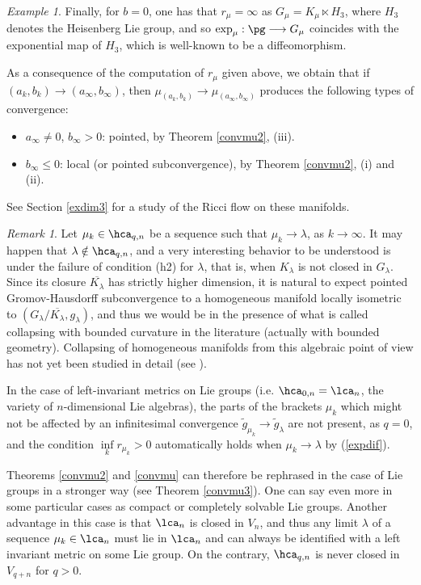 \documentclass[11pt]{amsart}
\theoremstyle{plain}
\theoremstyle{definition}
\theoremstyle{remark}
\newtheorem{remark}[theorem]{Remark}
\newtheorem{example}[theorem]{Example}
\begin{document}
\begin{example}
Finally, for $b=0$, one has that $r_\mu=\infty$ as $G_\mu=K_\mu\ltimes H_3$, where $H_3$ denotes the Heisenberg Lie group, and so $\exp_\mu:\pg\longrightarrow G_\mu$ coincides with the exponential map of $H_3$, which is well-known to be a diffeomorphism.

As a consequence of the computation of $r_\mu$ given above, we obtain that if $(a_k,b_k)\to (a_\infty,b_\infty)$, then $\mu_{(a_k,b_k)}\to \mu_{(a_\infty,b_\infty)}$ produces the following types of convergence:

\begin{itemize}
\item $a_\infty\ne 0$, $b_\infty>0$: pointed, by Theorem \ref{convmu2}, (iii).

\item $b_\infty\leq 0$: local (or pointed subconvergence), by Theorem \ref{convmu2}, (i) and (ii).
\end{itemize}
See Section \ref{exdim3} for a study of the Ricci flow on these manifolds.
\end{example}


\begin{remark}
Let $\mu_k\in\hca_{q,n}$ be a sequence such that $\mu_k\to\lambda$, as $k\to\infty$.  It may happen that $\lambda\notin\hca_{q,n}$, and a very interesting behavior to be understood is under the failure of condition (h2) for $\lambda$, that is, when $K_\lambda$ is not closed in $G_\lambda$.  Since its closure $\overline{K_\lambda}$ has strictly higher dimension, it is natural to expect pointed Gromov-Hausdorff subconvergence to a homogeneous manifold locally isometric to $(G_\lambda/\overline{K_\lambda},g_\lambda)$, and thus we would be in the presence of what is called collapsing with bounded curvature in the literature (actually with bounded geometry).  Collapsing of homogeneous manifolds from this algebraic point of view has not yet been studied in detail (see \cite[Section 6.5]{spacehm}).
\end{remark}


In the case of left-invariant metrics on Lie groups (i.e. $\hca_{0,n}=\lca_n$, the variety of $n$-dimensional Lie algebras), the parts of the brackets $\mu_k$ which might not be affected by an infinitesimal convergence $\tilde{g}_{\mu_k}\to\tilde{g}_\lambda$ are not present, as $q=0$, and the condition $\inf\limits_k r_{\mu_k}>0$ automatically holds when $\mu_k\to\lambda$ by (\ref{expdif}).

Theorems \ref{convmu2} and \ref{convmu} can therefore be rephrased in the case of Lie groups in a stronger way (see Theorem \ref{convmu3}).  One can say even more in some particular cases as compact or completely solvable Lie groups.  Another advantage in this case is that $\lca_n$ is closed in $V_n$, and thus any limit $\lambda$ of a sequence $\mu_k\in\lca_n$ must lie in $\lca_n$ and can always be identified with a left invariant metric on some Lie group.  On the contrary, $\hca_{q,n}$ is never closed in $V_{q+n}$ for $q>0$.
\end{document}
